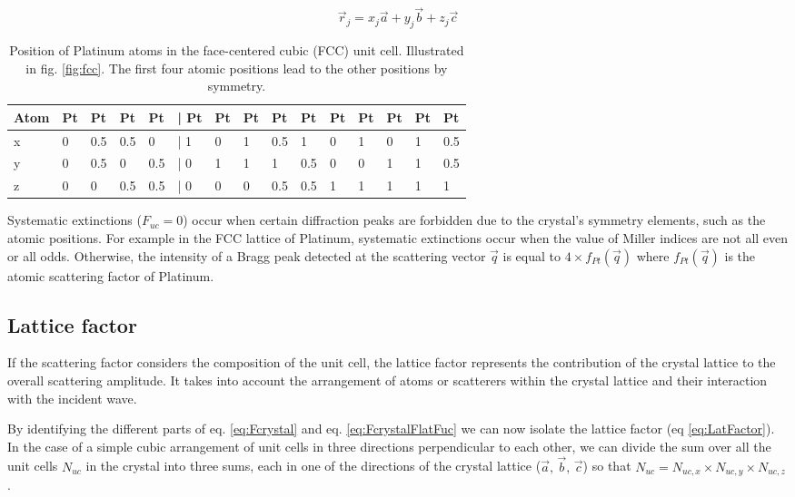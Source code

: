 \begin{equation}
    \label{eq:AtomPos}
    \vec{r}_j = x_j\vec{a} + y_j\vec{b} + z_j\vec{c}
\end{equation}

\begin{table}[!htb]
    \centering
    \begin{tabular}{@{}lllllllllllllll@{}}
    \toprule
    Atom & Pt & Pt  & Pt  & Pt  & | Pt & Pt & Pt & Pt  & Pt  & Pt & Pt & Pt & Pt & Pt  \\ \midrule
    x    & 0  & 0.5 & 0.5 & 0   & | 1  & 0  & 1  & 0.5 & 1   & 0  & 1  & 0  & 1  & 0.5 \\
    y    & 0  & 0.5 & 0   & 0.5 & | 0  & 1  & 1  & 1   & 0.5 & 0  & 0  & 1  & 1  & 0.5 \\
    z    & 0  & 0   & 0.5 & 0.5 & | 0  & 0  & 0  & 0.5 & 0.5 & 1  & 1  & 1  & 1  & 1   \\ \bottomrule
    \end{tabular}
    \caption{Position of Platinum atoms in the face-centered cubic (FCC) unit cell. Illustrated in fig. \ref{fig:fcc}. The first four atomic positions  lead to the other positions by symmetry.}
    \label{tab:PtAtoms}
\end{table}

Systematic extinctions ($F_{uc} = 0$) occur when certain diffraction peaks are forbidden due to the crystal's symmetry elements, such as the atomic positions.
For example in the FCC lattice of Platinum, systematic extinctions occur when the value of Miller indices are not all even or all odds.
Otherwise, the intensity of a Bragg peak detected at the scattering vector $\vec{q}$ is equal to $4\times f_{Pt}(\vec{q})$ where $f_{Pt}(\vec{q})$ is the atomic scattering factor of Platinum.

\subsection{Lattice factor}

If the scattering factor considers the composition of the unit cell, the lattice factor represents the contribution of the crystal lattice to the overall scattering amplitude.
It takes into account the arrangement of atoms or scatterers within the crystal lattice and their interaction with the incident wave.

By identifying the different parts of eq. \ref{eq:Fcrystal} and eq. \ref{eq:FcrystalFlatFuc} we can now isolate the lattice factor (eq \ref{eq:LatFactor}).
In the case of a simple cubic arrangement of unit cells in three directions perpendicular to each other, we can divide the sum over all the unit cells $N_{uc}$ in the crystal into three sums, each in one of the directions of the crystal lattice ($\vec{a}, \, \vec{b}, \, \vec{c}$) so that $N_{uc} = N_{uc, x} \times N_{uc, y} \times N_{uc, z}$.

